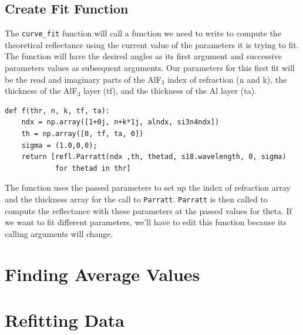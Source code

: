\documentclass[english]{scrartcl}
\begin{document}
\subsection{Create Fit Function}
The \texttt{curve\_fit} function will call a function we need to write to
compute the theoretical reflectance using the current value of the parameters
it is trying to fit. The function will have the desired angles as its first
argument and successive parameters values as subsequent arguments.  Our
parameters for this first fit
will be the read and imaginary parts of the AlF$_3$ index of refraction (n and k),
the thickness of the AlF$_3$ layer (tf), and the thickness of the Al layer (ta).
\begin{lstlisting}
def f(thr, n, k, tf, ta):
    ndx = np.array([1+0j, n+k*1j, alndx, si3n4ndx])
    th = np.array([0, tf, ta, 0])
    sigma = (1.0,0,0);
    return [refl.Parratt(ndx ,th, thetad, s18.wavelength, 0, sigma)
            for thetad in thr]
\end{lstlisting}
The function uses the passed parameters to set up the index of refraction
array and the thickness array for the call to \texttt{Parratt}. \texttt{Parratt}
is then called to compute the reflectance with these parameters at the passed
values for theta.
If we want to fit different parameters, we'll have to edit this function because
its calling arguments will change.

\section{Finding Average Values}

\section{Refitting Data}
\end{document}
